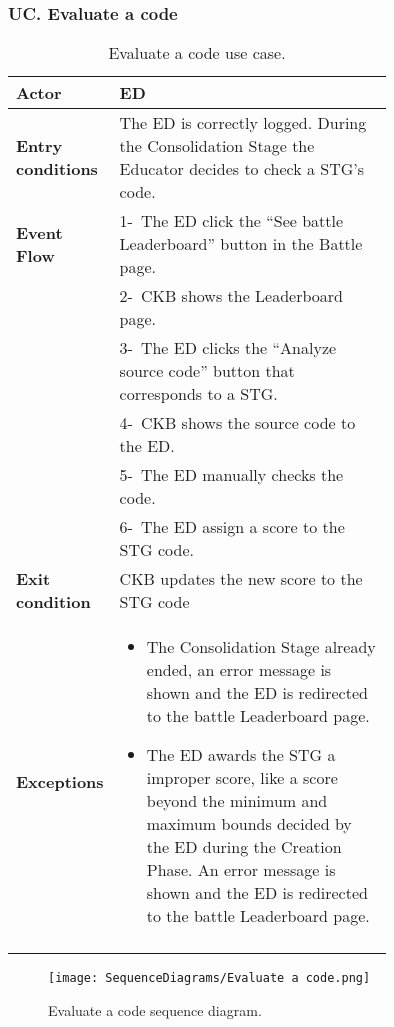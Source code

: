 \subsubsection*{UC\cuc . Evaluate a code}
\begin{center}
    \begin{longtable}{|l|p{0.75\linewidth}|}
        \hline
        \textbf{Actor}            & ED \\
        \hline
        \textbf{Entry conditions} & The ED is correctly logged. During the Consolidation Stage the Educator decides to check a STG’s code.        \\
        \hline
        \textbf{Event Flow}       & 1-\  The ED click the “See battle Leaderboard” button in the Battle page.      \\
        & 2-\   CKB shows the Leaderboard page.     \\
        & 3-\   The ED clicks the “Analyze source code” button that corresponds to a STG. \\
        & 4-\   CKB shows the source code to the ED.     \\
        & 5-\   The ED manually checks the code.     \\
        & 6-\   The ED assign a score to the STG code.     \\
        \hline
        \textbf{Exit condition}   & CKB updates the new score to the STG code       \\
        \hline
        \textbf{Exceptions}        & \begin{itemize}
            \item The Consolidation Stage already ended, an error message is shown and the ED is redirected to the battle Leaderboard page.
            \item The ED awards the STG a improper score, like a score beyond the minimum and maximum bounds decided by the ED during the Creation Phase. An error message is shown and the ED is redirected to the battle Leaderboard page.
         \end{itemize}    \\
        \hline
        \caption{Evaluate a code use case.}
        \label{tab: evaluate_a_code_use_case}
    \end{longtable}
\end{center}


\begin{figure}[H]
    \begin{center}
        \texttt{[image: SequenceDiagrams/Evaluate a code.png]}
        \caption{Evaluate a code sequence diagram.}
        \label{fig:evaluate_a_code_seqd}%
    \end{center}
\end{figure}

